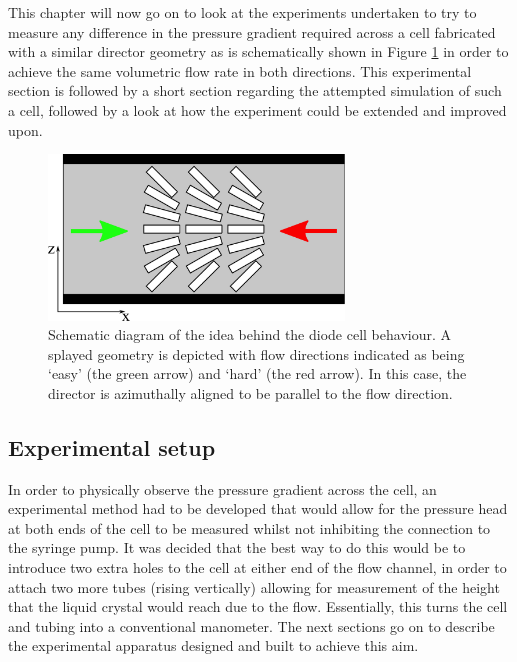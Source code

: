 This chapter will now go on to look at the experiments undertaken to try to measure any difference in the pressure gradient required across a cell fabricated with a similar director geometry as is schematically shown in Figure \ref{fig:schematic_diode} in order to achieve the same volumetric flow rate in both directions. This experimental section is followed by a short section regarding the attempted simulation of such a cell, followed by a look at how the experiment could be extended and improved upon.

\begin{figure}
\begin{center}
\includegraphics[width=0.7\textwidth]{Figures/Diode/schematic_diode}
\end{center}
\caption[Schematic diagram of a splayed `diode' cell]{\label{fig:schematic_diode}Schematic diagram of the idea behind the diode cell behaviour. A splayed geometry is depicted with flow directions indicated as being `easy' (the green arrow) and `hard' (the red arrow). In this case, the director is azimuthally aligned to be parallel to the flow direction.}
\end{figure}

\subsection{Experimental setup}
\label{sec:experimental_deets}
In order to physically observe the pressure gradient across the cell, an experimental method had to be developed that would allow for the pressure head at both ends of the cell to be measured whilst not inhibiting the connection to the syringe pump. It was decided that the best way to do this would be to introduce two extra holes to the cell at either end of the flow channel, in order to attach two more tubes (rising vertically) allowing for measurement of the height that the liquid crystal would reach due to the flow. Essentially, this turns the cell and tubing into a conventional manometer. The next sections go on to describe the experimental apparatus designed and built to achieve this aim.

